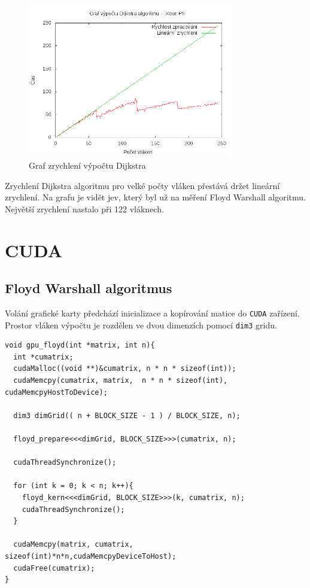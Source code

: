 \documentclass[a4paper,10pt]{article}
\begin{document}
\begin{figure}[H]
  \centering
    \includegraphics[width=0.8\textwidth]{graf_dijkstra_phi.png}
  \caption{Graf zrychlení výpočtu Dijkstra}
  \label{fig:dijkphi}
\end{figure}

Zrychlení Dijkstra algoritmu pro velké počty vláken přestává držet lineární zrychlení. Na grafu je vidět jev, který byl už na měření Floyd Warshall algoritmu. Největší zrychlení nastalo při 122 vláknech.

\section{CUDA}

\subsection{Floyd Warshall algoritmus}

Volání grafické karty předchází inicializace a kopírování matice do \texttt{CUDA} zařízení. Prostor vláken výpočtu je rozdělen ve dvou dimenzích pomocí \texttt{dim3} gridu.

\begin{verbatim}
void gpu_floyd(int *matrix, int n){
  int *cumatrix; 
  cudaMalloc((void **)&cumatrix, n * n * sizeof(int));
  cudaMemcpy(cumatrix, matrix,  n * n * sizeof(int), cudaMemcpyHostToDevice);
  
  dim3 dimGrid(( n + BLOCK_SIZE - 1 ) / BLOCK_SIZE, n);
  
  floyd_prepare<<<dimGrid, BLOCK_SIZE>>>(cumatrix, n);
  
  cudaThreadSynchronize();
     
  for (int k = 0; k < n; k++){
    floyd_kern<<<dimGrid, BLOCK_SIZE>>>(k, cumatrix, n);
    cudaThreadSynchronize();  
  }
  
  cudaMemcpy(matrix, cumatrix, sizeof(int)*n*n,cudaMemcpyDeviceToHost);  
  cudaFree(cumatrix);
}
\end{verbatim}
\end{document}

